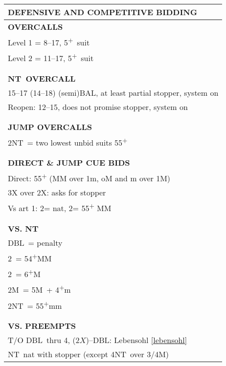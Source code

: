 \documentclass{article}
\newcommand{\C}{\texorpdfstring{\textcolor{ForestGreen}{\raisebox{-0.017em}{\ensuremath{\varclub}}}}{C}}
\newcommand{\D}{\texorpdfstring{\textcolor{YellowOrange}{\raisebox{-0.35pt}{\ensuremath{\vardiamond}}}}{D}}
\renewcommand{\H}{\texorpdfstring{\textcolor{Red}{\raisebox{-0.06em}{\ensuremath{\varheart}}}}{H}}
\newcommand\N{{\footnotesize NT}}
\newcommand{\+}{\textsuperscript{+}}
\newcommand{\X}{{\footnotesize{DBL}}}
\newcommand{\m}{m}
\newcommand{\M}{M}
\newcommand{\MM}{MM}
\begin{document}
\newpage
\noindent
\small
  \begin{adjustbox}{valign=t,minipage={90mm}}
    \begin{tabular}{|p{88mm}|}
      \hline
      \cellcolor[gray]{0.9} \textbf{DEFENSIVE AND COMPETITIVE BIDDING} \\ \hline
      \textbf{OVERCALLS} \\ \hline
      Level 1 = 8--17, 5\+\ suit\\
      Level 2 = 11--17, 5\+\ suit\\
      \\
      \\
      \hline
      \textbf{\N \ OVERCALL} \\ \hline
      15--17 (14--18) (semi)BAL, at least partial stopper, system on\\
      Reopen: 12--15, does not promise stopper, system on\\
      \\
      \\
      \hline
      \textbf{JUMP OVERCALLS} \\ \hline
      2\N\ = two lowest unbid suits 55\+\\
      \\
      \\
      \hline
      \textbf{DIRECT \& JUMP CUE BIDS} \\ \hline
      Direct: 55\+ (MM over 1m, oM and m over 1M)\\
      3X over 2X: asks for stopper\\
      Vs art 1\D: 2\D = nat, 2\H = 55\+ MM\\
      \\
      \\
      \hline
      \textbf{VS. NT} \\ \hline
      \X\ = penalty \\
      2\C\ = 54\+MM \\
      2\D\ = 6\+\M \\
      2\M\ = 5\M\ + 4\+\m\\
      2\N\ = 55\+mm \\
      \\
      \\
      \hline
      \textbf{VS. PREEMPTS} \\ \hline
      T/O \X\ thru 4\D, (2$X$)--\X: Lebensohl \ref{lebensohl}\\
      \N\ nat with stopper (except 4\N\ over 3/4\M)\\

\end{tabular}
\end{adjustbox}
\end{document}
